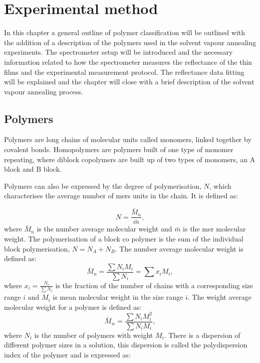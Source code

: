 \documentclass[MasterThesisMain.tex]{subfiles}
\begin{document}
	\chapter{Experimental method}\label{experimentalmethod}
	
In this chapter a general outline of polymer classification will be outlined with the addition of a description	of the polymers used in the solvent vapour annealing experiments. The spectrometer setup will be introduced and the necessary information related to how the spectrometer measures the reflectance of the thin films and the experimental measurement protocol. The reflectance data fitting will be explained and the chapter will close with a brief description of the solvent vapour annealing process. 
	
\section{Polymers}
Polymers are long chains of molecular units called monomers, linked together by covalent bonds. Homopolymers are polymers built of one type of monomer repeating, where diblock copolymers are built up of two types of monomers, an A block and B block. 

Polymers can also be expressed by the degree of polymerisation, $N$, which characterises the average number of mers units in the chain. It is defined as:

\begin{equation}
N = \frac{\bar{M}_n}{\bar{m}},
\end{equation}
where $\bar{M}_n$ is the number average molecular weight and $\bar{m}$ is the mer molecular weight. The polymerisation of a block co polymer is the sum of the individual block polymerisation, $N = N_A + N_B$. The number average molecular weight is defined as:
\begin{equation}
\bar{M}_n = \frac{\sum N_iM_i}{\sum N_i} = \sum x_iM_i,
\end{equation}      
where $x_i = \frac{N_i}{\sum N_i}$ is the fraction of the number of chains with a corresponding size range $i$ and $M_i$ is mean molecular weight in the size range $i$. The weight average molecular weight for a polymer is defined as:
\begin{equation}
\bar{M}_w=\frac{\sum N_iM_i^2}{\sum N_iM_i},
\end{equation}
where $N_i$ is the number of polymers with weight $M_i$. There is a dispersion of different polymer sizes in a solution, this dispersion is called the polydispersion index of the polymer and is expressed as:
\end{document}
